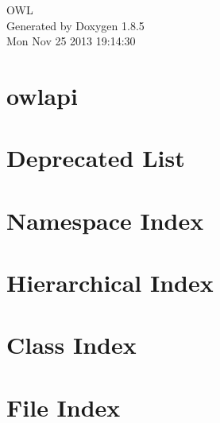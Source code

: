\documentclass[twoside]{book}
\newcommand{\clearemptydoublepage}{%
  \newpage{\pagestyle{empty}\cleardoublepage}%
}
\begin{document}
\hypersetup{pageanchor=false}
\begin{titlepage}
\vspace*{7cm}
\begin{center}%
{\Large O\-W\-L }\\
\vspace*{1cm}
{\large Generated by Doxygen 1.8.5}\\
\vspace*{0.5cm}
{\small Mon Nov 25 2013 19:14:30}\\
\end{center}
\end{titlepage}
\clearemptydoublepage
\tableofcontents
\clearemptydoublepage
{}
\hypersetup{pageanchor=true}

\chapter{owlapi}
\label{md__r_e_a_d_m_e}
\hypertarget{md__r_e_a_d_m_e}{}

\chapter{Deprecated List}
\label{deprecated}
\hypertarget{deprecated}{}

\chapter{Namespace Index}

\chapter{Hierarchical Index}

\chapter{Class Index}

\chapter{File Index}

\end{document}
